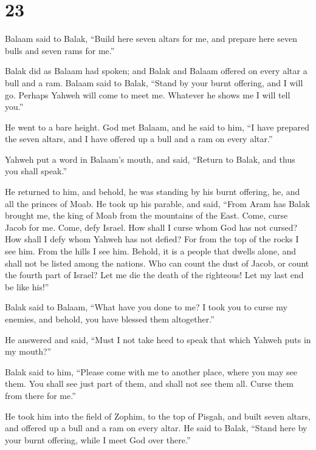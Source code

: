 \hypertarget{section-22}{%
\section{23}\label{section-22}}

 Balaam said to Balak, ``Build here seven altars for me,
and prepare here seven bulls and seven rams for me.''

 Balak did as Balaam had spoken; and Balak and Balaam
offered on every altar a bull and a ram.  Balaam said to
Balak, ``Stand by your burnt offering, and I will go. Perhaps Yahweh
will come to meet me. Whatever he shows me I will tell you.''

He went to a bare height.  God met Balaam, and he said to
him, ``I have prepared the seven altars, and I have offered up a bull
and a ram on every altar.''

 Yahweh put a word in Balaam's mouth, and said, ``Return
to Balak, and thus you shall speak.''

 He returned to him, and behold, he was standing by his
burnt offering, he, and all the princes of Moab.  He took
up his parable, and said, ``From Aram has Balak brought me, the king of
Moab from the mountains of the East. Come, curse Jacob for me. Come,
defy Israel.  How shall I curse whom God has not cursed?
How shall I defy whom Yahweh has not defied?  For from the
top of the rocks I see him. From the hills I see him. Behold, it is a
people that dwells alone, and shall not be listed among the nations.
 Who can count the dust of Jacob, or count the fourth
part of Israel? Let me die the death of the righteous! Let my last end
be like his!''

 Balak said to Balaam, ``What have you done to me? I took
you to curse my enemies, and behold, you have blessed them altogether.''

 He answered and said, ``Must I not take heed to speak
that which Yahweh puts in my mouth?''

 Balak said to him, ``Please come with me to another
place, where you may see them. You shall see just part of them, and
shall not see them all. Curse them from there for me.''

 He took him into the field of Zophim, to the top of
Pisgah, and built seven altars, and offered up a bull and a ram on every
altar.  He said to Balak, ``Stand here by your burnt
offering, while I meet God over there.''

